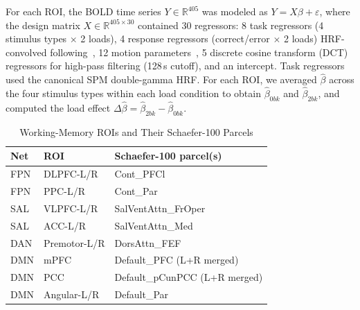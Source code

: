 \documentclass[conference]{IEEEtran}
\begin{document}
For each ROI, the BOLD time series $Y \in \mathbb{R}^{405}$ was modeled as $Y = X \beta + \varepsilon$, where the design matrix $X \in \mathbb{R}^{405 \times 30}$ contained 30 regressors: 8 task regressors (4 stimulus types $\times$ 2 loads), 4 response regressors (correct/error $\times$ 2 loads) HRF-convolved following~\cite{friston1998event}, 12 motion parameters~\cite{friston1996movement}, 5 discrete cosine transform (DCT) regressors for high-pass filtering (128\,s cutoff), and an intercept. Task regressors used the canonical SPM double-gamma HRF. For each ROI, we averaged $\hat{\beta}$ across the four stimulus types within each load condition to obtain $\hat{\beta}_{0bk}$ and $\hat{\beta}_{2bk}$, and computed the load effect $\Delta\hat{\beta}=\hat{\beta}_{2bk}-\hat{\beta}_{0bk}$.

\begin{table}[t]
\caption{Working-Memory ROIs and Their Schaefer-100 Parcels}
\label{tab:roi}
\centering
\footnotesize
\setlength{\tabcolsep}{3pt}
\begin{tabular}{@{}lll@{}}
\toprule
\textbf{Net} & \textbf{ROI} & \textbf{Schaefer-100 parcel(s)} \\
\midrule
FPN & DLPFC-L/R & Cont\_PFCl \\
FPN & PPC-L/R & Cont\_Par \\
SAL & VLPFC-L/R & SalVentAttn\_FrOper \\
SAL & ACC-L/R & SalVentAttn\_Med \\
DAN & Premotor-L/R & DorsAttn\_FEF \\
DMN & mPFC & Default\_PFC (L+R merged) \\
DMN & PCC & Default\_pCunPCC (L+R merged) \\
DMN & Angular-L/R & Default\_Par \\
\bottomrule
\end{tabular}
\end{table}
\end{document}
